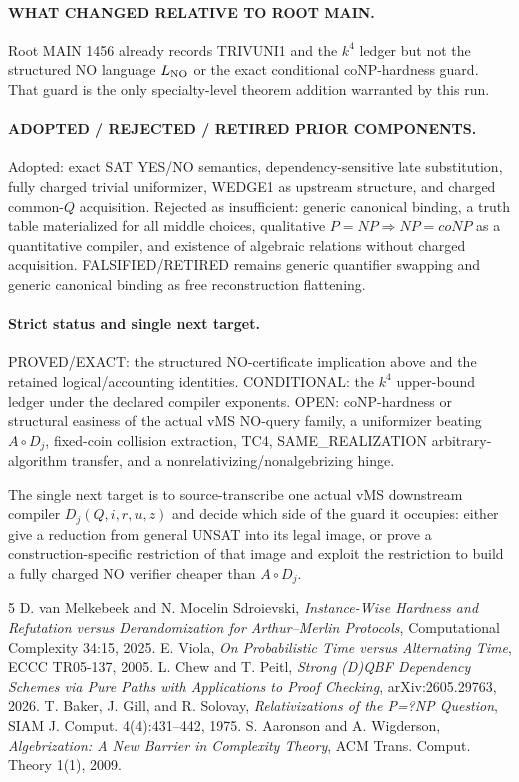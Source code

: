 \documentclass[11pt]{article}
\begin{document}
\paragraph{WHAT CHANGED RELATIVE TO ROOT MAIN.}
Root MAIN 1456 already records TRIVUNI1 and the $k^4$ ledger but not the structured NO language $L_{\rm NO}$ or the exact conditional coNP-hardness guard. That guard is the only specialty-level theorem addition warranted by this run.

\paragraph{ADOPTED / REJECTED / RETIRED PRIOR COMPONENTS.}
Adopted: exact SAT YES/NO semantics, dependency-sensitive late substitution, fully charged trivial uniformizer, WEDGE1 as upstream structure, and charged common-$Q$ acquisition. Rejected as insufficient: generic canonical binding, a truth table materialized for all middle choices, qualitative $P=NP\Rightarrow NP=coNP$ as a quantitative compiler, and existence of algebraic relations without charged acquisition. FALSIFIED/RETIRED remains generic quantifier swapping and generic canonical binding as free reconstruction flattening.

\paragraph{Strict status and single next target.}
PROVED/EXACT: the structured NO-certificate implication above and the retained logical/accounting identities. CONDITIONAL: the $k^4$ upper-bound ledger under the declared compiler exponents. OPEN: coNP-hardness or structural easiness of the actual vMS NO-query family, a uniformizer beating $A\circ D_j$, fixed-coin collision extraction, TC4, SAME\_REALIZATION arbitrary-algorithm transfer, and a nonrelativizing/nonalgebrizing hinge.

The single next target is to source-transcribe one actual vMS downstream compiler $D_j(Q,i,r,u,z)$ and decide which side of the guard it occupies: either give a reduction from general UNSAT into its legal image, or prove a construction-specific restriction of that image and exploit the restriction to build a fully charged NO verifier cheaper than $A\circ D_j$.

\begin{thebibliography}{5}
 D. van Melkebeek and N. Mocelin Sdroievski, \emph{Instance-Wise Hardness and Refutation versus Derandomization for Arthur--Merlin Protocols}, Computational Complexity 34:15, 2025.
 E. Viola, \emph{On Probabilistic Time versus Alternating Time}, ECCC TR05-137, 2005.
 L. Chew and T. Peitl, \emph{Strong (D)QBF Dependency Schemes via Pure Paths with Applications to Proof Checking}, arXiv:2605.29763, 2026.
 T. Baker, J. Gill, and R. Solovay, \emph{Relativizations of the P=?NP Question}, SIAM J. Comput. 4(4):431--442, 1975.
 S. Aaronson and A. Wigderson, \emph{Algebrization: A New Barrier in Complexity Theory}, ACM Trans. Comput. Theory 1(1), 2009.
\end{thebibliography}
\end{document}
